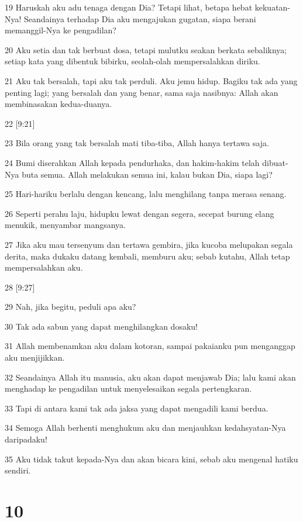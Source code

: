 \par 19 Haruskah aku adu tenaga dengan Dia? Tetapi lihat, betapa hebat kekuatan-Nya! Seandainya terhadap Dia aku mengajukan gugatan, siapa berani memanggil-Nya ke pengadilan?
\par 20 Aku setia dan tak berbuat dosa, tetapi mulutku seakan berkata sebaliknya; setiap kata yang dibentuk bibirku, seolah-olah mempersalahkan diriku.
\par 21 Aku tak bersalah, tapi aku tak perduli. Aku jemu hidup. Bagiku tak ada yang penting lagi; yang bersalah dan yang benar, sama saja nasibnya: Allah akan membinasakan kedua-duanya.
\par 22 [9:21]
\par 23 Bila orang yang tak bersalah mati tiba-tiba, Allah hanya tertawa saja.
\par 24 Bumi diserahkan Allah kepada pendurhaka, dan hakim-hakim telah dibuat-Nya buta semua. Allah melakukan semua ini, kalau bukan Dia, siapa lagi?
\par 25 Hari-hariku berlalu dengan kencang, lalu menghilang tanpa merasa senang.
\par 26 Seperti perahu laju, hidupku lewat dengan segera, secepat burung elang menukik, menyambar mangsanya.
\par 27 Jika aku mau tersenyum dan tertawa gembira, jika kucoba melupakan segala derita, maka dukaku datang kembali, memburu aku; sebab kutahu, Allah tetap mempersalahkan aku.
\par 28 [9:27]
\par 29 Nah, jika begitu, peduli apa aku?
\par 30 Tak ada sabun yang dapat menghilangkan dosaku!
\par 31 Allah membenamkan aku dalam kotoran, sampai pakaianku pun menganggap aku menjijikkan.
\par 32 Seandainya Allah itu manusia, aku akan dapat menjawab Dia; lalu kami akan menghadap ke pengadilan untuk menyelesaikan segala pertengkaran.
\par 33 Tapi di antara kami tak ada jaksa yang dapat mengadili kami berdua.
\par 34 Semoga Allah berhenti menghukum aku dan menjauhkan kedahsyatan-Nya daripadaku!
\par 35 Aku tidak takut kepada-Nya dan akan bicara kini, sebab aku mengenal hatiku sendiri.

\chapter{10}

